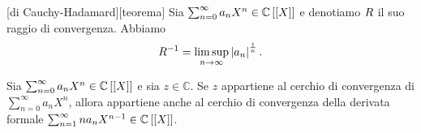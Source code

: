 \begin{Theorem}
	[di Cauchy-Hadamard][teorema]
	Sia $\sum_{n = 0}^\infty a_n X^n \in \mathbb{C} \left [ \left [ X \right ] \right ]$ e denotiamo $R$ il suo raggio di convergenza. Abbiamo
	\[
		R^{-1}
    = \limsup_{n \rightarrow \infty} \left \lvert a_n \right \rvert^\frac{1}{n}.
	\]
\end{Theorem}
\begin{Theorem}
	\label{SuccessioniESerie_ConvergenzaDerivataFormale}
	Sia $\sum_{n = 0}^\infty a_n X^n \in \mathbb{C} \left [ \left [ X \right ] \right ]$ e sia $z \in \mathbb{C}$. Se $z$ appartiene al cerchio di convergenza di  $\sum_{n = 0}^\infty a_n X^n$, allora appartiene anche al cerchio di convergenza della derivata formale $\sum_{n = 1}^\infty n a_n X^{n - 1} \in \mathbb{C} \left [ \left [ X \right ] \right ]$.
\end{Theorem}
